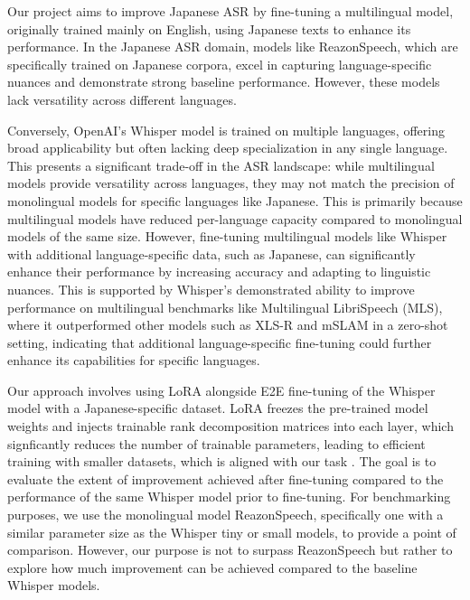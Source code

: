\documentclass[10pt,twocolumn,letterpaper]{article}
\begin{document}
Our project aims to improve Japanese ASR by fine-tuning a multilingual model, originally trained mainly on English, using Japanese texts to enhance its performance. In the Japanese ASR domain, models like ReazonSpeech, which are specifically trained on Japanese corpora\cite{huggingfaceReazonspeechDatasets}, excel in capturing language-specific nuances and demonstrate strong baseline performance. However, these models lack versatility across different languages.


Conversely, OpenAI's Whisper model is trained on multiple languages\cite{radford2023robust}, offering broad applicability but often lacking deep specialization in any single language\cite{githubWhispermodelcardmdMain}. This presents a significant trade-off in the ASR landscape: while multilingual models provide versatility across languages, they may not match the precision of monolingual models for specific languages like Japanese. This is primarily because multilingual models have reduced per-language capacity compared to monolingual models of the same size. However, fine-tuning multilingual models like Whisper with additional language-specific data, such as Japanese, can significantly enhance their performance by increasing accuracy and adapting to linguistic nuances. This is supported by Whisper's demonstrated ability to improve performance on multilingual benchmarks like Multilingual LibriSpeech (MLS), where it outperformed other models such as XLS-R and mSLAM in a zero-shot setting, indicating that additional language-specific fine-tuning could further enhance its capabilities for specific languages\cite{radford2023robust}.


Our approach involves using LoRA \cite{huLoRALowRankAdaptation2021} alongside E2E fine-tuning of the Whisper model with a Japanese-specific dataset. LoRA freezes the pre-trained model weights and injects trainable rank decomposition matrices into each layer, which signficantly reduces the number of trainable parameters, leading to efficient training with smaller datasets, which is aligned with our task \cite{huLoRALowRankAdaptation2021}. The goal is to evaluate the extent of improvement achieved after fine-tuning compared to the performance of the same Whisper model prior to fine-tuning. For benchmarking purposes, we use the monolingual model ReazonSpeech\cite{githubReazonSpeech}, specifically one with a similar parameter size as the Whisper tiny or small models\cite{githubOpenaiWhisper}, to provide a point of comparison. However, our purpose is not to surpass ReazonSpeech but rather to explore how much improvement can be achieved compared to the baseline Whisper models.
\end{document}
